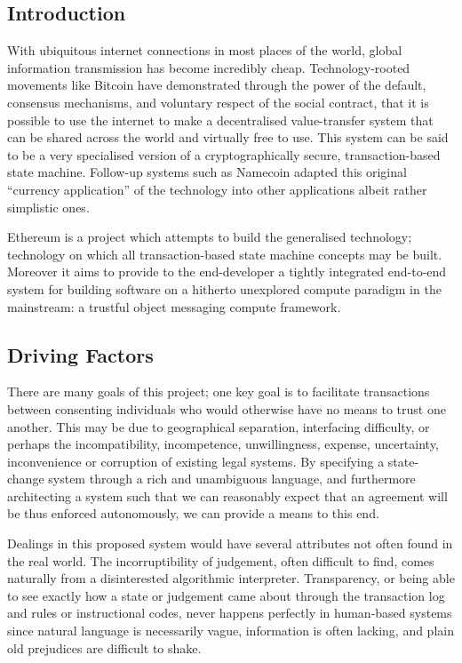\documentclass[9pt,oneside]{amsart}
\begin{document}
\setlength{\columnsep}{20pt}
\begin{multicols}{2}

\section{Introduction}\label{sec:introduction}

With ubiquitous internet connections in most places of the world, global information transmission has become incredibly cheap. Technology-rooted movements like Bitcoin have demonstrated through the power of the default, consensus mechanisms, and voluntary respect of the social contract, that it is possible to use the internet to make a decentralised value-transfer system that can be shared across the world and virtually free to use. This system can be said to be a very specialised version of a cryptographically secure, transaction-based state machine. Follow-up systems such as Namecoin adapted this original ``currency application'' of the technology into other applications albeit rather simplistic ones.

Ethereum is a project which attempts to build the generalised technology; technology on which all transaction-based state machine concepts may be built. Moreover it aims to provide to the end-developer a tightly integrated end-to-end system for building software on a hitherto unexplored compute paradigm in the mainstream: a trustful object messaging compute framework.

\subsection{Driving Factors} \label{ch:driving}

There are many goals of this project; one key goal is to facilitate transactions between consenting individuals who would otherwise have no means to trust one another. This may be due to geographical separation, interfacing difficulty, or perhaps the incompatibility, incompetence, unwillingness, expense, uncertainty, inconvenience or corruption of existing legal systems. By specifying a state-change system through a rich and unambiguous language, and furthermore architecting a system such that we can reasonably expect that an agreement will be thus enforced autonomously, we can provide a means to this end.

Dealings in this proposed system would have several attributes not often found in the real world. The incorruptibility of judgement, often difficult to find, comes naturally from a disinterested algorithmic interpreter. Transparency, or being able to see exactly how a state or judgement came about through the transaction log and rules or instructional codes, never happens perfectly in human-based systems since natural language is necessarily vague, information is often lacking, and plain old prejudices are difficult to shake.


\end{multicols}
\end{document}

